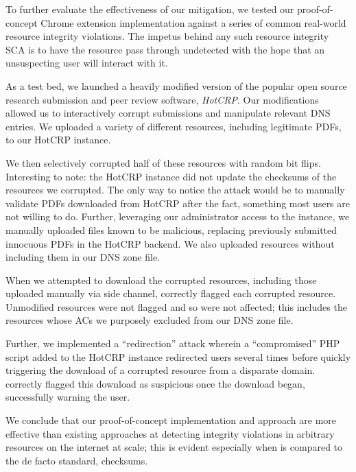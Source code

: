 
To further evaluate the effectiveness of our mitigation, we tested our
proof-of-concept \SYSTEM{} Chrome extension implementation against a series of
common real-world resource integrity violations. The impetus behind any such
resource integrity SCA is to have the resource pass through undetected with the
hope that an unsuspecting user will interact with it.

As a test bed, we launched a heavily modified version of the popular open source
research submission and peer review software, \emph{HotCRP}. Our modifications
allowed us to interactively corrupt submissions and manipulate relevant DNS
entries. We uploaded a variety of different resources, including legitimate
PDFs, to our HotCRP instance.

We then selectively corrupted half of these resources with random bit flips.
Interesting to note: the HotCRP instance did not update the checksums of the
resources we corrupted. The only way to notice the attack would be to manually
validate PDFs downloaded from HotCRP after the fact, something most users are
not willing to do. Further, leveraging our administrator access to the instance,
we manually uploaded files known to be malicious, replacing previously submitted
innocuous PDFs in the HotCRP backend. We also uploaded resources without
including them in our DNS zone file.

When we attempted to download the corrupted resources, including those uploaded
manually via side channel, \SYSTEM{} correctly flagged each corrupted resource.
Unmodified resources were not flagged and so were not affected; this includes
the resources whose ACs we purposely excluded from our DNS zone file.

Further, we implemented a ``redirection'' attack wherein a ``compromised'' PHP
script added to the HotCRP instance redirected users several times before
quickly triggering the download of a corrupted resource from a disparate domain.
\SYSTEM{} correctly flagged this download as suspicious once the download began,
successfully warning the user.

We conclude that our proof-of-concept \SYSTEM{} implementation and approach are
more effective than existing approaches at detecting integrity violations in
arbitrary resources on the internet at scale; this is evident especially when
\SYSTEM{} is compared to the de facto standard, checksums.

